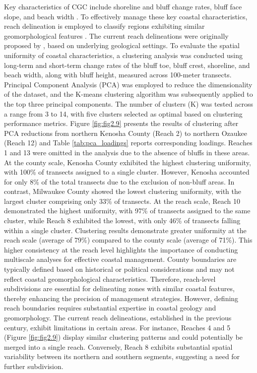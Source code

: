 Key characteristics of CGC include shoreline and bluff change rates, bluff face
slope, and beach width \citep{swenson_bluff_2006}. To effectively manage these
key coastal characteristics, reach delineation is employed to classify regions
exhibiting similar geomorphological features \citep{shipman2008geomorphic}. The
current reach delineations were originally proposed by
\citet{mickelson1977shoreline}, based on underlying geological settings. To
evaluate the spatial uniformity of coastal characteristics, a clustering
analysis was conducted using long-term and short-term change rates of the bluff
toe, bluff crest, shoreline, and beach width, along with bluff height, measured
across 100-meter transects. Principal Component Analysis (PCA) was employed to
reduce the dimensionality of the dataset, and the K-means clustering algorithm
was subsequently applied to the top three principal components. The number of
clusters (K) was tested across a range from 3 to 14, with five clusters selected
as optimal based on clustering performance metrics. Figure \ref{fig:fig2.9}
presents the results of clustering after PCA reductions from northern Kenosha
County (Reach 2) to northern Ozaukee (Reach 12) and Table \ref{tab:pca_loadings}
reports corresponding loadings. Reaches 1 and 13 were omitted in the analysis
due to the absence of bluffs in these areas. At the county scale, Kenosha County
exhibited the highest clustering uniformity, with 100\% of transects assigned to
a single cluster.  However, Kenosha accounted for only 8\% of the total
transects due to the exclusion of non-bluff areas. In contrast, Milwaukee County
showed the lowest clustering uniformity, with the largest cluster comprising
only 33\% of transects. At the reach scale, Reach 10 demonstrated the highest
uniformity, with 97\% of transects assigned to the same cluster, while Reach 8
exhibited the lowest, with only 46\% of transects falling within a single
cluster. Clustering results demonstrate greater uniformity at the reach scale
(average of 79\%) compared to the county scale (average of 71\%). This higher
consistency at the reach level highlights the importance of conducting
multiscale analyses for effective coastal management. County boundaries are
typically defined based on historical or political considerations and may not
reflect coastal geomorphological characteristics. Therefore, reach-level
subdivisions are essential for delineating zones with similar coastal features,
thereby enhancing the precision of management strategies. However, defining
reach boundaries requires substantial expertise in coastal geology and
geomorphology. The current reach delineations, established in the previous
century, exhibit limitations in certain areas. For instance, Reaches 4 and 5
(Figure \ref{fig:fig2.9}) display similar clustering patterns and could
potentially be merged into a single reach.  Conversely, Reach 8 exhibits
substantial spatial variability between its northern and southern segments,
suggesting a need for further subdivision.

